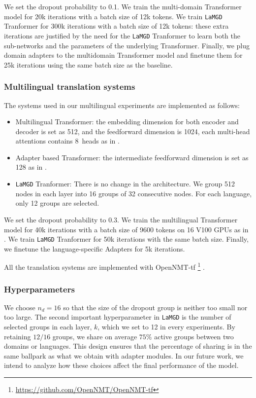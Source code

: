 \documentclass[11pt]{article}
\newcommand{\fyDone}[1]{\done[FY]\Todo[FY:]{\textcolor{orange}{#1}}}
\newcommand{\system}[1]{\texttt{{#1}}}
\begin{document}
We set the dropout probability to 0.1. We train the multi-domain Transformer model for 20k iterations with a batch size of 12k tokens. We train \system{LaMGD} Tranformer for 300k iterations with a batch size of 12k tokens: these extra iterations are justified by the need for the \system{LaMGD} Tranformer to learn both the sub-networks and the parameters of the underlying Transformer.\fyDone{Have we converged?} Finally, we plug domain adapters to the multidomain Transformer model and finetune them for 25k iterations using the same batch size as the baseline.

\subsubsection{Multilingual translation systems}
The systems used in our multilingual experiments are implemented as follows:
\begin{itemize}
\item Multilingual Transformer: the embedding dimension for both encoder and decoder is set as 512, and the feedforward dimension is 1024, each multi-head attentions contains 8~heads as in \citep{Wang20balancing}.
\item Adapter based Transformer: the intermediate feedforward dimension is set as 128 as in \citep{Gong21adaptive}.
\item \system{LaMGD} Tranformer: There is no change in the architecture. We group 512 nodes in each layer into 16 groups of 32 consecutive nodes. For each language, only 12 groups are selected. 
\end{itemize}

We set the dropout probability to 0.3. We train the multilingual Transformer model for 40k iterations with a batch size of 9600 tokens on 16 V100 GPUs as in \citet{Gong21adaptive}. We train \system{LaMGD} Tranformer for 50k iterations with the same batch size. Finally, we finetune the language-specific Adapters for 5k iterations.

All the translation systems are implemented with OpenNMT-tf \footnote{\url{https://github.com/OpenNMT/OpenNMT-tf}} \cite{Klein17opennmt}.\fyDone{Fix this, add reference to framework if needed}

\subsubsection{Hyperparameters}
\label{ssec:hyperparams}
We choose $n_d = 16$ so that the size of the dropout group is neither too small nor too large. The second important hyperparameter in \system{LaMGD} is the number of selected groups in each layer, $k$, which we set to 12 in every experiments. By retaining $12/16$ groups, we share on average $75 \%$ active groups between two domains or languages. This design ensures that the percentage of sharing is in the same ballpark as what we obtain with adapter modules. In our future work, we intend to analyze how these choices affect the final performance of the model.
\end{document}
